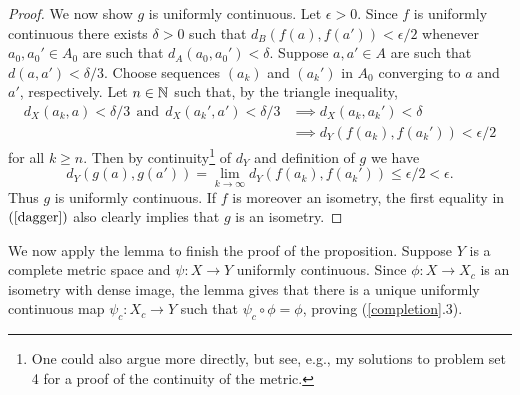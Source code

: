 \begin{proof}
  \medskip
  We now show $g$ is uniformly continuous. Let $\epsilon > 0$. Since
  $f$ is uniformly continuous there exists $\delta > 0$ such that
  $d_B(f(a),f(a')) < \epsilon/2$ whenever $a_0,a_0' \in A_0$ are such
  that $d_A(a_0,a_0') < \delta$. Suppose $a,a' \in A$ are such that
  $d(a,a') < \delta/3$. Choose sequences $(a_k)$ and $(a_k')$ in $A_0$
  converging to $a$ and $a'$, respectively. Let $n \in \mathbb{N}$ such that,
  by the triangle inequality,
  \begin{align*}
  d_X(a_k,a) < \delta/3\ \ \text{and}\ \ d_X(a_k',a') < \delta/3
  &\implies d_X(a_k,a_k') < \delta \\ &\implies d_Y(f(a_k),f(a_k')) <
  \epsilon/2
  \end{align*}
  for all $k \ge n$. Then by continuity\footnote{One could also argue
    more directly, but see, e.g., my solutions to problem set 4 for a
    proof of the continuity of the metric.} of $d_Y$ and definition of
  $g$ we have
  \begin{equation}
    \label{dagger}
    d_Y(g(a),g(a')) = \lim_{k \to \infty} d_Y(f(a_k),f(a_k')) \le
    \epsilon/2 < \epsilon.
  \end{equation}
  Thus $g$ is uniformly continuous. If $f$ is moreover an isometry,
  the first equality in $(\ref{dagger})$ also clearly implies that $g$
  is an isometry.
\end{proof}

We now apply the lemma to finish the proof of the proposition. Suppose
$Y$ is a complete metric space and $\psi : X \to Y$ uniformly
continuous. Since $\phi : X \to X_c$ is an isometry with dense image,
the lemma gives that there is a unique uniformly continuous map
$\psi_c : X_c \to Y$ such that $\psi_c \circ \phi = \phi$, proving
(\ref{completion}.3).

